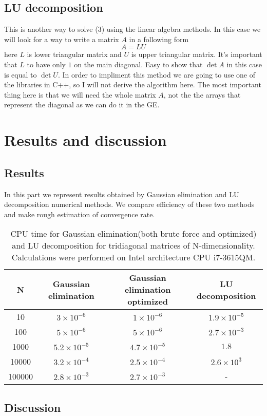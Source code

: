 \documentclass[10pt]{article}
\begin{document}
\subsection{LU decomposition}
This is another way to solve (3) using the linear algebra methods. In this case we will look for a way to write a matrix $ A $ in a following form
\begin{equation}
A=LU
\end{equation}
here $ L $ is lower triangular matrix and $ U $ is upper triangular matrix. It's important that $ L $ to have only $ 1 $ on the main diagonal. Easy to show that $ \det A $ in this case is equal to $ \det U $. In order to impliment this method we are going to use one of the libraries in C++, so I will not derive the algorithm here. The most important thing here is that we will need the whole matrix $ A $, not the the arrays that represent the diagonal as we can do it in the GE.
\section{Results and discussion}
\subsection{Results}
In this part we represent results obtained by Gaussian elimination and LU decomposition numerical methods. We compare efficiency of these two methods and make rough estimation of convergence rate.
\begin{table}
  \caption{CPU time for Gaussian elimination(both brute force and optimized) and LU decomposition for tridiagonal matrices of N-dimensionality. Calculations were performed on Intel architecture CPU i7-3615QM.}
  \label{tab:one}

  \begin{center}
    \begin{tabular}{c|c|c|c}
    \hline
        N & Gaussian elimination & Gaussian elimination optimized & LU decomposition \\
        \hline
        10 & $3 \times 10^{-6}$ & $1 \times 10^{-6}$ & $1.9 \times 10^{-5}$ \\
        100 & $5 \times 10^{-6}$ & $5 \times 10^{-6}$ & $2.7 \times 10^{-3}$\\
        1000 & $5.2 \times 10^{-5}$ & $4.7 \times 10^{-5}$ & $1.8$\\
        10000 & $3.2 \times 10^{-4}$ & $2.5 \times 10^{-4}$ & $2.6 \times 10^{3}$\\
        100000 & $2.8 \times 10^{-3}$ & $2.7 \times 10^{-3}$ & -\\
    \end{tabular}
  \end{center}
\end{table}

\subsection{Discussion}
\end{document}
